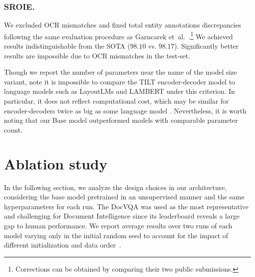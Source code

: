 \documentclass[runningheads]{llncs}
\begin{document}
\subsubsection{SROIE.}
We excluded OCR mismatches and fixed total entity annotations discrepancies following the same evaluation procedure as Garncarek et~al.~\cite{garncarek2020lambert}.\footnote{Corrections can be obtained by comparing their two public submissions.} We achieved results indistinguishable from the SOTA ($98.10$ vs. $98.17$). Significantly better results are impossible due to OCR mismatches in the test-set.

\bigskip\noindent Though we report the number of parameters near the name of the model size variant, note it is impossible to compare the TILT encoder-decoder model to language models such as LayoutLMs and LAMBERT under this criterion. In particular, it does not reflect computational cost, which may be similar for encoder-decoders twice as big as some language model \cite[Section 3.2.2]{2020t5}. Nevertheless, it is worth noting that our Base model outperformed models with comparable parameter count.



\section{Ablation study}
In the following section, we analyze the design choices in our architecture, considering the base model pretrained in an unsupervised manner and the same hyperparameters for each run.
The DocVQA was used as the most representative and challenging for Document Intelligence since its leaderboard reveals a large gap to human performance.
We report average results over two runs of each model varying only in the initial random seed to account for the impact of different initialization and data order~\cite{dodge2020finetuning}. 
\end{document}

